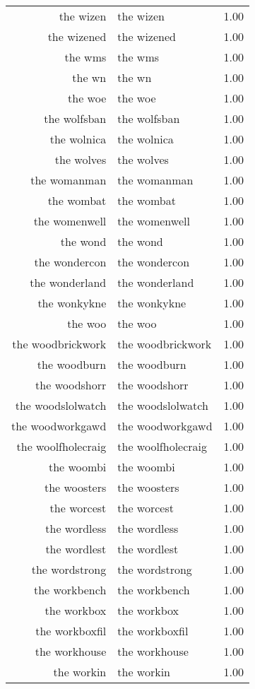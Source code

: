 \begin{table}[ht]
\begin{tabular}{rlr}
  the wizen & the wizen & 1.00 \\ 
  the wizened & the wizened & 1.00 \\ 
  the wms & the wms & 1.00 \\ 
  the wn & the wn & 1.00 \\ 
  the woe & the woe & 1.00 \\ 
  the wolfsban & the wolfsban & 1.00 \\ 
  the wolnica & the wolnica & 1.00 \\ 
  the wolves & the wolves & 1.00 \\ 
  the womanman & the womanman & 1.00 \\ 
  the wombat & the wombat & 1.00 \\ 
  the womenwell & the womenwell & 1.00 \\ 
  the wond & the wond & 1.00 \\ 
  the wondercon & the wondercon & 1.00 \\ 
  the wonderland & the wonderland & 1.00 \\ 
  the wonkykne & the wonkykne & 1.00 \\ 
  the woo & the woo & 1.00 \\ 
  the woodbrickwork & the woodbrickwork & 1.00 \\ 
  the woodburn & the woodburn & 1.00 \\ 
  the woodshorr & the woodshorr & 1.00 \\ 
  the woodslolwatch & the woodslolwatch & 1.00 \\ 
  the woodworkgawd & the woodworkgawd & 1.00 \\ 
  the woolfholecraig & the woolfholecraig & 1.00 \\ 
  the woombi & the woombi & 1.00 \\ 
  the woosters & the woosters & 1.00 \\ 
  the worcest & the worcest & 1.00 \\ 
  the wordless & the wordless & 1.00 \\ 
  the wordlest & the wordlest & 1.00 \\ 
  the wordstrong & the wordstrong & 1.00 \\ 
  the workbench & the workbench & 1.00 \\ 
  the workbox & the workbox & 1.00 \\ 
  the workboxfil & the workboxfil & 1.00 \\ 
  the workhouse & the workhouse & 1.00 \\ 
  the workin & the workin & 1.00 \\ 

\end{tabular}
\end{table}
